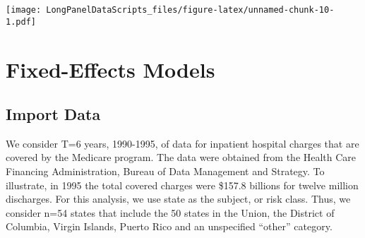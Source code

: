\documentclass[]{book}
\begin{document}
\texttt{[image: LongPanelDataScripts\_files/figure-latex/unnamed-chunk-10-1.pdf]}

\hypertarget{fixed-effects-models}{%
\chapter{Fixed-Effects Models}\label{fixed-effects-models}}

\hypertarget{import-data-1}{%
\section{Import Data}\label{import-data-1}}

We consider T=6 years, 1990-1995, of data for inpatient hospital charges that are covered by the Medicare program. The data were obtained from the Health Care Financing Administration, Bureau of Data Management and Strategy. To illustrate, in 1995 the total covered charges were \$157.8 billions for twelve million discharges. For this analysis, we use state as the subject, or risk class. Thus, we consider n=54 states that include the 50 states in the Union, the District of Columbia, Virgin Islands, Puerto Rico and an unspecified ``other'' category.
\end{document}
